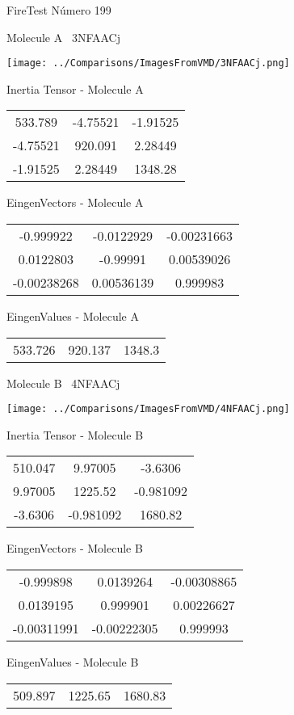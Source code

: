 \vtab[-3cm]
\begin{center}
{\large FireTest \tab Número 199}
\end{center}
\begin{multicols}{2}
\begin{center}

Molecule A \
3NFAACj

\texttt{[image: ../Comparisons/ImagesFromVMD/3NFAACj.png]}

Inertia Tensor - Molecule A \\
\begin{tabular}{|c c c|}
533.789	 & 	-4.75521	 & 	-1.91525	 \\
-4.75521	 & 	920.091	 & 	2.28449	 \\
-1.91525	 & 	2.28449	 & 	1348.28
\end{tabular}

\vtab
 EingenVectors - Molecule A     \\
\begin{tabular}{|c c c|}
-0.999922	 & 	-0.0122929	 & 	-0.00231663	 \\
0.0122803	 & 	-0.99991	 & 	0.00539026	 \\
-0.00238268	 & 	0.00536139	 & 	0.999983
\end{tabular}

\vtab
 EingenValues - Molecule A     \\
\begin{tabular}{|c c c|}
533.726	 & 	920.137	 & 	1348.3	 \\
\end{tabular}
\columnbreak

Molecule B \
4NFAACj

\texttt{[image: ../Comparisons/ImagesFromVMD/4NFAACj.png]}

Inertia Tensor - Molecule B \\
\begin{tabular}{|c c c|}
510.047	 & 	9.97005	 & 	-3.6306	 \\
9.97005	 & 	1225.52	 & 	-0.981092	 \\
-3.6306	 & 	-0.981092	 & 	1680.82
\end{tabular}

\vtab
 EingenVectors - Molecule B     \\
\begin{tabular}{|c c c|}
-0.999898	 & 	0.0139264	 & 	-0.00308865	 \\
0.0139195	 & 	0.999901	 & 	0.00226627	 \\
-0.00311991	 & 	-0.00222305	 & 	0.999993
\end{tabular}

\vtab
 EingenValues - Molecule B     \\
\begin{tabular}{|c c c|}
509.897	 & 	1225.65	 & 	1680.83	 \\
\end{tabular}

\end{center}
\end{multicols}

